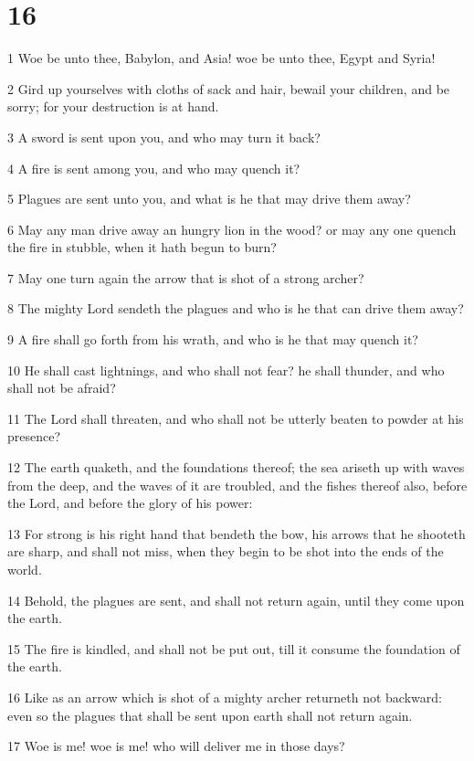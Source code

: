 \chapter{16}

\par 1 Woe be unto thee, Babylon, and Asia! woe be unto thee, Egypt and Syria!
\par 2 Gird up yourselves with cloths of sack and hair, bewail your children, and be sorry; for your destruction is at hand.
\par 3 A sword is sent upon you, and who may turn it back?
\par 4 A fire is sent among you, and who may quench it?
\par 5 Plagues are sent unto you, and what is he that may drive them away?
\par 6 May any man drive away an hungry lion in the wood? or may any one quench the fire in stubble, when it hath begun to burn?
\par 7 May one turn again the arrow that is shot of a strong archer?
\par 8 The mighty Lord sendeth the plagues and who is he that can drive them away?
\par 9 A fire shall go forth from his wrath, and who is he that may quench it?
\par 10 He shall cast lightnings, and who shall not fear? he shall thunder, and who shall not be afraid?
\par 11 The Lord shall threaten, and who shall not be utterly beaten to powder at his presence?
\par 12 The earth quaketh, and the foundations thereof; the sea ariseth up with waves from the deep, and the waves of it are troubled, and the fishes thereof also, before the Lord, and before the glory of his power:
\par 13 For strong is his right hand that bendeth the bow, his arrows that he shooteth are sharp, and shall not miss, when they begin to be shot into the ends of the world.
\par 14 Behold, the plagues are sent, and shall not return again, until they come upon the earth.
\par 15 The fire is kindled, and shall not be put out, till it consume the foundation of the earth.
\par 16 Like as an arrow which is shot of a mighty archer returneth not backward: even so the plagues that shall be sent upon earth shall not return again.
\par 17 Woe is me! woe is me! who will deliver me in those days?
